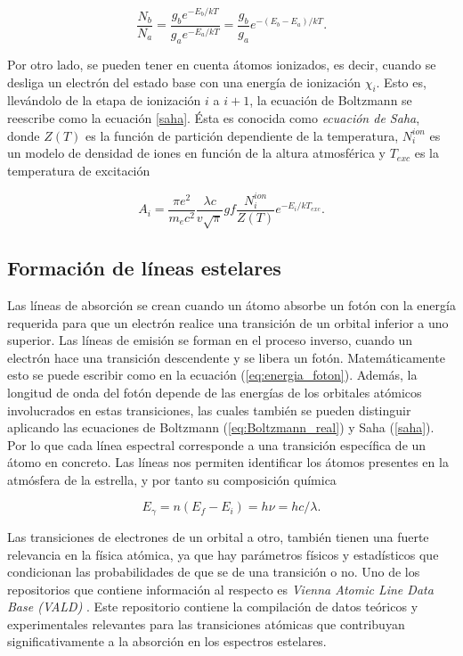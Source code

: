 \documentclass[12pt,oneside,openany,letter]{book}
\begin{document}
\begin{equation}
\frac{N_{b}}{N_{a}}=\frac{g_{b} e^{-E_{b} / k T}}{g_{a} e^{-E_{a} / k T}}=\frac{g_{b}}{g_{a}} e^{-\left(E_{b}-E_{a}\right) / kT}.
\label{eq:Boltzmann_real}
\end{equation}


\noindent Por otro lado, se pueden tener en cuenta átomos ionizados, es decir, cuando se desliga un electrón del estado base con una energía de  ionización $\chi_i$. Esto es, llevándolo de la etapa de ionización $i$ a $i+1$, la ecuación de Boltzmann se reescribe como la ecuación \eqref{saha}. Ésta es conocida como \textit{ecuación de Saha}, donde $Z(T)$ es la función de partición dependiente de la temperatura, $N_i^{ion}$ es un modelo de densidad de iones en función de la altura atmosférica y $T_{exc}$ es la temperatura de excitación

\begin{equation}
A_{i} = \frac{\pi e^{2}}{m_{e} c^{2}} \frac{\lambda c}{v \sqrt{\pi}} g f \frac{N_{i}^{ion}}{Z(T)} e^{-E_{i} / k T_{exc}}.
\label{saha}
\end{equation}

\subsection{Formación de líneas estelares}

Las líneas de absorción se crean cuando un átomo absorbe un fotón con la energía requerida para que un electrón realice una transición de un orbital inferior a uno superior. Las líneas de emisión se forman en el proceso inverso, cuando un electrón hace una transición descendente y se libera un fotón. Matemáticamente esto se puede escribir como en la ecuación (\ref{eq:energia_foton}). Además, la longitud de onda del fotón depende de las energías de los orbitales atómicos involucrados en estas transiciones, las cuales también se pueden distinguir aplicando las ecuaciones de Boltzmann (\ref{eq:Boltzmann_real}) y Saha (\ref{saha}). Por lo que cada línea espectral corresponde a una transición específica de un átomo en concreto. Las líneas nos permiten identificar los átomos presentes en la atmósfera de la estrella, y por tanto su composición química

\begin{equation}
    E_{\gamma} = n(E_f - E_i) = h \nu = hc/\lambda.
    \label{eq:energia_foton}
\end{equation}

\noindent Las transiciones de electrones de un orbital a otro, también tienen una fuerte relevancia en la física atómica, ya que hay parámetros físicos y estadísticos que condicionan las probabilidades de que se de una transición o no. Uno de los repositorios que contiene información al respecto es \textit{Vienna Atomic Line Data Base (VALD)} \citep{piskunov1995vald}. Este repositorio contiene la compilación de datos teóricos y experimentales relevantes para las transiciones atómicas que contribuyan significativamente a la absorción en los espectros estelares.
\end{document}
